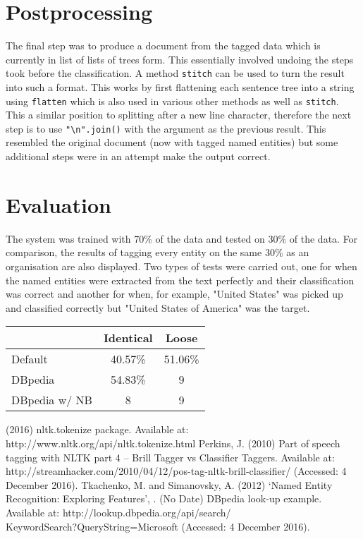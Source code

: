 \documentclass[10pt]{article}
\begin{document}
\begin{multicols}{2}
\section{Postprocessing}
The final step was to produce a document from the tagged data which is currently in list of lists of trees form. This essentially involved undoing the steps took before the classification. A method {{\tt stitch}} can be used to turn the result into such a format. This works by first flattening each sentence tree into a string using {{\tt flatten}} which is also used in various other methods as well as {{\tt stitch}}. This a similar position to splitting after a new line character, therefore the next step is to use {{\tt "\textbackslash n".join()}} with the argument as the previous result. This resembled the original document (now with tagged named entities) but some additional steps were in an attempt make the output correct. 

\section{Evaluation}
The system was trained with 70\% of the data and tested on 30\% of the data. For comparison, the results of tagging every entity on the same 30\% as an organisation are also displayed. Two types of tests were carried out, one for when the named entities were extracted from the text perfectly and their classification was correct and another for when, for example, "United States" was picked up and classified correctly but "United States of America" was the target.

\begin{center}
  \begin{tabular}{| l | c | c |}
    \hline
     & Identical & Loose \\ \hline
    Default & 40.57\% & 51.06\% \\ \hline
    DBpedia & 54.83\% & 9 \\ \hline
    DBpedia w/ NB & 8 & 9 \\ 
    \hline
  \end{tabular}
\end{center}




\end{multicols}
\begin{thebibliography}{9}
(2016) nltk.tokenize package. Available at: http://www.nltk.org/api/nltk.tokenize.html
Perkins, J. (2010) Part of speech tagging with NLTK part 4 – Brill Tagger vs Classifier Taggers. Available at: http://streamhacker.com/2010/04/12/pos-tag-nltk-brill-classifier/ (Accessed: 4 December 2016).
Tkachenko, M. and Simanovsky, A. (2012) ‘Named Entity Recognition: Exploring Features’, .
(No Date) DBpedia look-up example. Available at: http://lookup.dbpedia.org/api/search/\\KeywordSearch?QueryString=Microsoft (Accessed: 4 December 2016).
\end{thebibliography}
\end{document}
